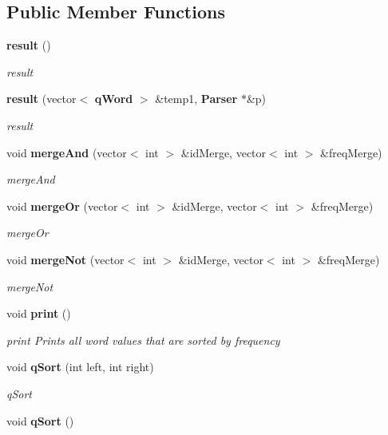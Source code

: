 \subsection*{Public Member Functions}
\begin{DoxyCompactItemize}
\item 
{\bf result} ()\label{classresult_ad82f937012d03ea93364031666897225}

\begin{DoxyCompactList}\small\item\em result \end{DoxyCompactList}\item 
{\bf result} (vector$<$ {\bf q\+Word} $>$ \&temp1, {\bf Parser} $\ast$\&p)
\begin{DoxyCompactList}\small\item\em result \end{DoxyCompactList}\item 
void {\bf merge\+And} (vector$<$ int $>$ \&id\+Merge, vector$<$ int $>$ \&freq\+Merge)
\begin{DoxyCompactList}\small\item\em merge\+And \end{DoxyCompactList}\item 
void {\bf merge\+Or} (vector$<$ int $>$ \&id\+Merge, vector$<$ int $>$ \&freq\+Merge)
\begin{DoxyCompactList}\small\item\em merge\+Or \end{DoxyCompactList}\item 
void {\bf merge\+Not} (vector$<$ int $>$ \&id\+Merge, vector$<$ int $>$ \&freq\+Merge)
\begin{DoxyCompactList}\small\item\em merge\+Not \end{DoxyCompactList}\item 
void {\bf print} ()\label{classresult_aa3017b87fb7e7a65365cc9575731047b}

\begin{DoxyCompactList}\small\item\em print Prints all word values that are sorted by frequency \end{DoxyCompactList}\item 
void {\bf q\+Sort} (int left, int right)
\begin{DoxyCompactList}\small\item\em q\+Sort \end{DoxyCompactList}\item 
void {\bfseries q\+Sort} ()\label{classresult_a68389b354f9d9020bfa51267b8cd9233}

\end{DoxyCompactItemize}
